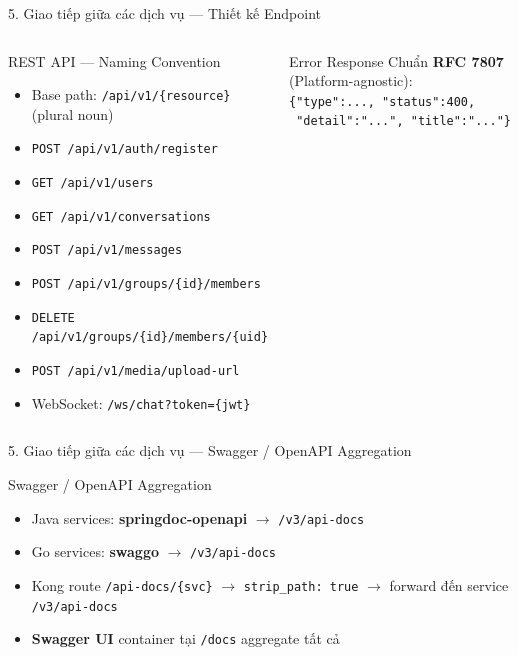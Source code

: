 \documentclass[aspectratio=169,compress]{beamer}
\begin{document}
\begin{frame}{5. Giao tiếp giữa các dịch vụ --- Thiết kế Endpoint}
\begin{columns}[T]
\begin{block}{REST API --- Naming Convention}
\begin{itemize}
  \item Base path: \texttt{/api/v1/\{resource\}} (plural noun)
  \item \texttt{POST /api/v1/auth/register}
  \item \texttt{GET /api/v1/users}
  \item \texttt{GET /api/v1/conversations}
  \item \texttt{POST /api/v1/messages}
  \item \texttt{POST /api/v1/groups/\{id\}/members}
  \item \texttt{DELETE /api/v1/groups/\{id\}/members/\{uid\}}
  \item \texttt{POST /api/v1/media/upload-url}
  \item WebSocket: \texttt{/ws/chat?token=\{jwt\}}
\end{itemize}
\end{block}

\begin{block}{Error Response}
Chuẩn \textbf{RFC 7807} (Platform-agnostic):\\
\texttt{\{"type":..., "status":400,}\\
\texttt{ "detail":"...", "title":"..."\}}
\end{block}
\end{columns}
\end{frame}

\begin{frame}{5. Giao tiếp giữa các dịch vụ --- Swagger / OpenAPI Aggregation}
\begin{block}{Swagger / OpenAPI Aggregation}
\begin{itemize}
  \item Java services: \textbf{springdoc-openapi} $\rightarrow$ \texttt{/v3/api-docs}
  \item Go services: \textbf{swaggo} $\rightarrow$ \texttt{/v3/api-docs}
  \item Kong route \texttt{/api-docs/\{svc\}} $\rightarrow$ \texttt{strip\_path: true} $\rightarrow$ forward đến service \texttt{/v3/api-docs}
  \item \textbf{Swagger UI} container tại \texttt{/docs} aggregate tất cả
\end{itemize}
\end{block}
\end{frame}
\end{document}
